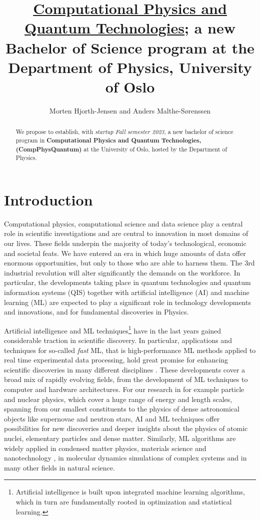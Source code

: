 \documentclass[aps,rmp,preprint,amsmath,amssymb,graphicx,longbibliography]{revtex4-1}
\begin{document}
\title{\underline{Computational Physics and Quantum Technologies}; a new Bachelor of Science program  at the Department of Physics, University of Oslo}

\author{Morten Hjorth-Jensen and Anders Malthe-Sørenssen}


\begin{abstract}
We propose to establish, with {\em startup Fall semester 2023}, a new bachelor of science  program in {\bf Computational Physics and Quantum Technologies, (CompPhysQuantum)}  at the University of Oslo, hosted by the Department of Physics. 
\end{abstract}
\maketitle
\section{Introduction}

Computational physics, computational science and data science play a
central role in scientific investigations and are central to
innovation in most domains of our lives. These fields underpin the
majority of today's technological, economic and societal feats. We
have entered an era in which huge amounts of data offer enormous
opportunities, but only to those who are able to harness them. The 3rd
industrial revolution will alter significantly the demands on the
workforce. In particular, the developments taking place in quantum
technologies and quantum information systems (QIS) together with
artificial intelligence (AI) and machine learning (ML) are expected to
play a significant role in technology developments and innovations,
and for fundamental discoveries in Physics.

Artificial intelligence and ML techniques\footnote{Artificial
intelligence is built upon integrated machine learning algorithms,
which in turn are fundamentally rooted in optimization and statistical
learning.} have in the last years gained considerable traction in
scientific discovery. In particular, applications and techniques for
so-called {\em fast} ML, that is high-performance ML methods applied
to real time experimental data processing, hold great promise for
enhancing scientific discoveries in many different disciplines
\cite{deiana2021}.  These developments cover a broad mix of rapidly
evolving fields, from the development of ML techniques to computer and
hardware architectures. For our research in for example particle and
nuclear physics, which cover a huge range of energy and length scales,
spanning from our smallest constituents to the physics of dense
astronomical objects like supernovae and neutron stars, AI and ML
techniques offer possibilities for new discoveries and deeper insights
about the physics of atomic nuclei, elementary particles and dense
matter. Similarly, ML algorithms are widely applied in condensed
matter physics, materials science and nanotechnology
\cite{Schleder2019}, in molecular dynamics simulations of complex
systems and in many other fields in natural science.
\end{document}
